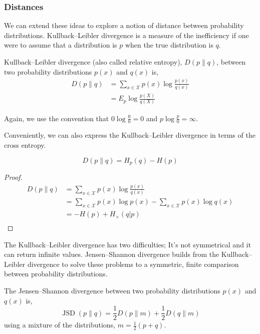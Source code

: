 

\subsubsection{Distances}
We can extend these ideas to explore a notion of distance between probability distributions. Kullback–Leibler divergence is a measure of the inefficiency if one were to assume that a distribution is $p$ when the true distribution is $q$.

\begin{definition}
	Kullback–Leibler divergence (also called relative entropy), $D(p \|q)$,  between two probability distributions $p(x)$ and $q(x)$ is,
	\begin{align} 
		D(p \| q) &=\sum_{x \in \mathcal{X}} p(x) \log \frac{p(x)}{q(x)} \\ 
					 &=E_{p} \log \frac{p(X)}{q(X)} 
	\end{align}
\end{definition}

Again, we use the convention that  $0 \log \frac{0}{0} = 0 $ and $p \log \frac{p}{0} = \infty $. 

Conveniently, we can also express the Kullback–Leibler divergence in terms of the cross entropy.
\begin{lemma}
		\begin{equation}
		D(p \| q) = H_p(q) - H(p) 
		\end{equation}
\end{lemma}
\begin{proof}
	\begin{align}
		D(p \| q) &=\sum_{x \in \mathcal{X}} p(x) \log \frac{p(x)}{q(x)} \\
		 &= \sum_{x \in \mathcal{X}} p(x) \log p(x)    -     \sum_{x \in \mathcal{X}} p(x) \log q(x)\\
		 &= -H(p)   +    H_{\times} (q|p)\\
	\end{align}
\end{proof}

The Kullback–Leibler divergence has two difficulties; It's not symmetrical and it can return infinite values. Jensen–Shannon divergence builds from the Kullback–Leibler divergence to solve these problems to a symmetric, finite comparison between probability distributions. 


\begin{definition}
 The Jensen–Shannon divergence between two probability distributions $p(x)$ and $q(x)$ is,
	\begin{equation}
	\operatorname{JSD}(p \| q)=\frac{1}{2} D(p \| m)+\frac{1}{2} D(q \| m)
	\end{equation}
	using a mixture of the distributions, 	$m=\frac{1}{2}(p+q)$.
\end{definition}

